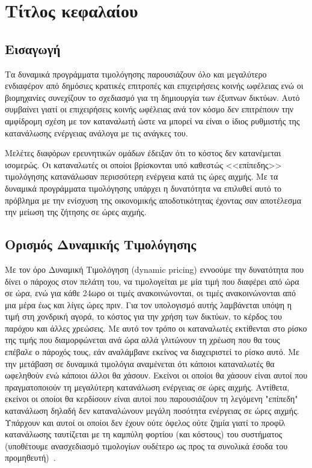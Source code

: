 \chapter{Τίτλος κεφαλαίου}
\label{chap2}

\section{Εισαγωγή}
Τα δυναμικά προγράμματα τιμολόγησης παρουσιάζουν όλο και μεγαλύτερο ενδιαφέρον από δημόσιες κρατικές επιτροπές και επιχειρήσεις κοινής ωφέλειας ενώ οι βιομηχανίες συνεχίζουν το σχεδιασμό για τη δημιουργία των έξυπνων δικτύων. Αυτό συμβαίνει γιατί οι επιχειρήσεις κοινής ωφέλειας ανά τον κόσμο δεν επιτρέπουν την αμφίδρομη σχέση με τον καταναλωτή ώστε να μπορεί να είναι ο ίδιος ρυθμιστής της κατανάλωσης ενέργειας ανάλογα με τις ανάγκες του.

Μελέτες διαφόρων ερευνητικών ομάδων έδειξαν ότι το κόστος δεν κατανέμεται ισομερώς. Οι καταναλωτές οι οποίοι βρίσκονται υπό καθεστώς <<επίπεδης>> τιμολόγησης κατανάλωσαν περισσότερη ενέργεια κατά τις ώρες αιχμής. Με τα δυναμικά προγράμματα τιμολόγησης υπάρχει η δυνατότητα να επιλυθεί αυτό το πρόβλημα με την ενίσχυση της οικονομικής αποδοτικότητας έχοντας σαν αποτέλεσμα την μείωση της ζήτησης σε ώρες αιχμής.

\section{Ορισμός Δυναμικής Τιμολόγησης}
Με τον όρο Δυναμική Τιμολόγηση (dynamic pricing) εννοούμε την δυνατότητα που δίνει ο πάροχος στον πελάτη του, να τιμολογείται με μία τιμή που διαφέρει από ώρα σε ώρα, ενώ για κάθε 24ωρο οι τιμές ανακοινώνονται, οι τιμές ανακοινώνονται από μια μέρα έως και λίγες ώρες πριν. Για τον υπολογισμό αυτής λαμβάνεται υπόψη η τιμή στη χονδρική αγορά, το κόστος για την χρήση των δικτύων, το κέρδος του παρόχου και άλλες χρεώσεις. Με αυτό τον τρόπο οι καταναλωτές εκτίθενται στο ρίσκο της τιμής που διαμορφώνεται ανά ώρα αλλά γλιτώνουν τη χρέωση που θα τους επέβαλε ο πάροχός τους, εάν αναλάμβανε εκείνος να διαχειριστεί το ρίσκο αυτό. Με την μετάβαση σε δυναμικά τιμολόγια αναμένεται ότι κάποιοι καταναλωτές θα ωφεληθούν ενώ κάποιοι άλλοι θα χάσουν. Εκείνοι οι οποίοι θα χάσουν είναι αυτοί που πραγματοποιούν τη μεγαλύτερη κατανάλωση ενέργειας σε ώρες αιχμής. Αντίθετα, εκείνοι οι οποίοι θα κερδίσουν είναι αυτοί που παρουσιάζουν τη λεγόμενη "επίπεδη" κατανάλωση δηλαδή δεν καταναλώνουν μεγάλη ποσότητα ενέργειας σε ώρες αιχμής. Υπάρχουν και αυτοί οι οποίοι δεν έχουν ούτε όφελος ούτε ζημία γιατί το προφίλ κατανάλωσης ταυτίζεται με τη καμπύλη φορτίου (και κόστους) του συστήματος (υποθέτουμε ανασχεδιασμό τιμολογίων ουδέτερο ως προς τα συνολικά έσοδα του προμηθευτή)~\cite{[MR99]}.

